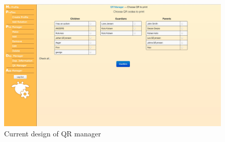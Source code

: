 \begin{figure}
\centering
\includegraphics[width=1\textwidth]{images/mockup/qrManagerCurrent.jpg}
\caption{Current design of QR manager}
\label{fig:qrManagerCurrentDesign}
\end{figure}